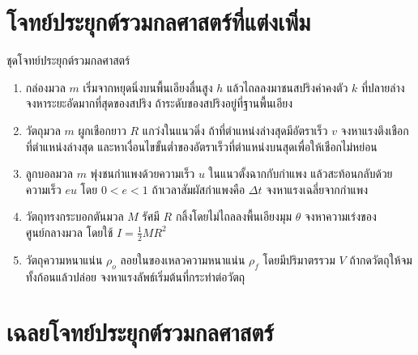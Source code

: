 \section{โจทย์ประยุกต์รวมกลศาสตร์ที่แต่งเพิ่ม}

\begin{exercisebox}{ชุดโจทย์ประยุกต์รวมกลศาสตร์}
\begin{enumerate}
    \item กล่องมวล $m$ เริ่มจากหยุดนิ่งบนพื้นเอียงลื่นสูง $h$ แล้วไถลลงมาชนสปริงค่าคงตัว $k$ ที่ปลายล่าง จงหาระยะอัดมากที่สุดของสปริง ถ้าระดับของสปริงอยู่ที่ฐานพื้นเอียง

    \item วัตถุมวล $m$ ผูกเชือกยาว $R$ แกว่งในแนวดิ่ง ถ้าที่ตำแหน่งล่างสุดมีอัตราเร็ว $v$ จงหาแรงตึงเชือกที่ตำแหน่งล่างสุด และหาเงื่อนไขขั้นต่ำของอัตราเร็วที่ตำแหน่งบนสุดเพื่อให้เชือกไม่หย่อน

    \item ลูกบอลมวล $m$ พุ่งชนกำแพงด้วยความเร็ว $u$ ในแนวตั้งฉากกับกำแพง แล้วสะท้อนกลับด้วยความเร็ว $eu$ โดย $0<e<1$ ถ้าเวลาสัมผัสกำแพงคือ $\Delta t$ จงหาแรงเฉลี่ยจากกำแพง

    \item วัตถุทรงกระบอกตันมวล $M$ รัศมี $R$ กลิ้งโดยไม่ไถลลงพื้นเอียงมุม $\theta$ จงหาความเร่งของศูนย์กลางมวล โดยใช้ $I=\frac{1}{2}MR^2$

    \item วัตถุความหนาแน่น $\rho_o$ ลอยในของเหลวความหนาแน่น $\rho_f$ โดยมีปริมาตรรวม $V$ ถ้ากดวัตถุให้จมทั้งก้อนแล้วปล่อย จงหาแรงลัพธ์เริ่มต้นที่กระทำต่อวัตถุ
\end{enumerate}
\end{exercisebox}

\section{เฉลยโจทย์ประยุกต์รวมกลศาสตร์}

